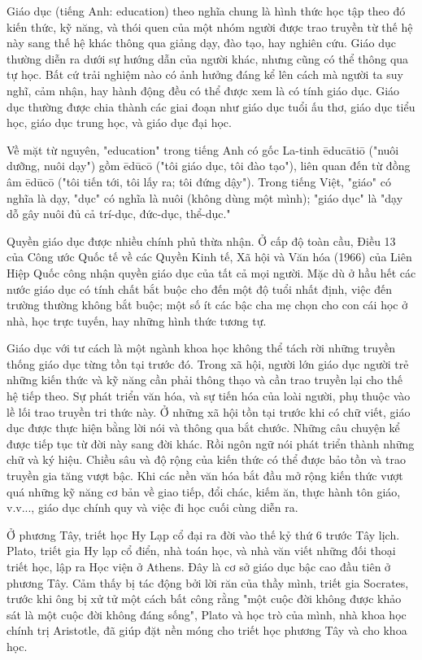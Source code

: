 \documentclass[../thesis.tex]{subfiles}
\begin{document}
Giáo dục \cite{einstein} (tiếng Anh: education) theo nghĩa chung là hình thức học tập theo đó kiến thức, kỹ năng, và thói quen của một nhóm người được trao truyền từ thế hệ này sang thế hệ khác thông qua giảng dạy, đào tạo, hay nghiên cứu. Giáo dục thường diễn ra dưới sự hướng dẫn của người khác, nhưng cũng có thể thông qua tự học. Bất cứ trải nghiệm nào có ảnh hưởng đáng kể lên cách mà người ta suy nghĩ, cảm nhận, hay hành động đều có thể được xem là có tính giáo dục. Giáo dục thường được chia thành các giai đoạn như giáo dục tuổi ấu thơ, giáo dục tiểu học, giáo dục trung học, và giáo dục đại học.

Về mặt từ nguyên, "education"\cite{e1instein} trong tiếng Anh có gốc La-tinh ēducātiō ("nuôi dưỡng, nuôi dạy") gồm ēdūcō ("tôi giáo dục, tôi đào tạo"), liên quan đến từ đồng âm ēdūcō ("tôi tiến tới, tôi lấy ra; tôi đứng dậy"). Trong tiếng Việt, "giáo" có nghĩa là dạy, "dục" có nghĩa là nuôi (không dùng một mình); "giáo dục" là "dạy dỗ gây nuôi đủ cả trí-dục, đức-dục, thể-dục."

Quyền giáo dục được nhiều chính phủ thừa nhận. Ở cấp độ toàn cầu, Điều 13 của Công ước Quốc tế về các Quyền Kinh tế, Xã hội và Văn hóa (1966) của Liên Hiệp Quốc công nhận quyền giáo dục của tất cả mọi người. Mặc dù ở hầu hết các nước giáo dục có tính chất bắt buộc cho đến một độ tuổi nhất định, việc đến trường thường không bắt buộc; một số ít các bậc cha mẹ chọn cho con cái học ở nhà, học trực tuyến, hay những hình thức tương tự.

Giáo dục với tư cách là một ngành khoa học không thể tách rời những truyền thống giáo dục từng tồn tại trước đó. Trong xã hội, người lớn giáo dục người trẻ những kiến thức và kỹ năng cần phải thông thạo và cần trao truyền lại cho thế hệ tiếp theo. Sự phát triển văn hóa, và sự tiến hóa của loài người, phụ thuộc vào lề lối trao truyền tri thức này. Ở những xã hội tồn tại trước khi có chữ viết, giáo dục được thực hiện bằng lời nói và thông qua bắt chước. Những câu chuyện kể được tiếp tục từ đời này sang đời khác. Rồi ngôn ngữ nói phát triển thành những chữ và ký hiệu. Chiều sâu và độ rộng của kiến thức có thể được bảo tồn và trao truyền gia tăng vượt bậc. Khi các nền văn hóa bắt đầu mở rộng kiến thức vượt quá những kỹ năng cơ bản về giao tiếp, đổi chác, kiếm ăn, thực hành tôn giáo, v.v..., giáo dục chính quy và việc đi học cuối cùng diễn ra.

Ở phương Tây, triết học Hy Lạp cổ đại ra đời vào thế kỷ thứ 6 trước Tây lịch. Plato, triết gia Hy lạp cổ điển, nhà toán học, và nhà văn viết những đối thoại triết học, lập ra Học viện ở Athens. Đây là cơ sở giáo dục bậc cao đầu tiên ở phương Tây. Cảm thấy bị tác động bởi lời răn của thầy mình, triết gia Socrates, trước khi ông bị xử tử một cách bất công rằng "một cuộc đời không được khảo sát là một cuộc đời không đáng sống", Plato và học trò của mình, nhà khoa học chính trị Aristotle, đã giúp đặt nền móng cho triết học phương Tây và cho khoa học.
\end{document}
